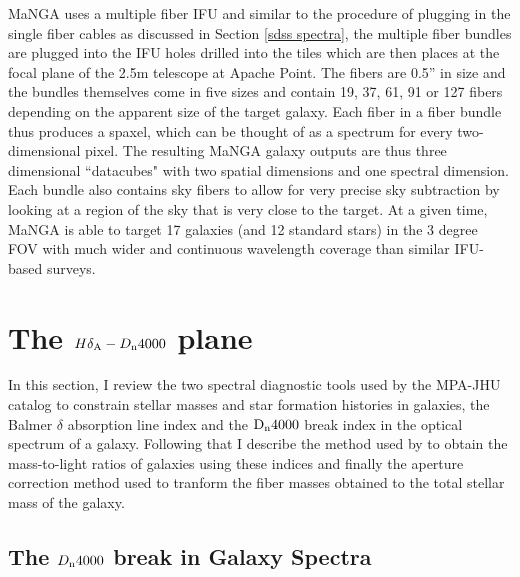 MaNGA uses a multiple fiber IFU \citep{drory_manga_2015} and similar to the procedure of plugging in the single fiber cables as discussed in Section \ref{sdss spectra}, the multiple fiber bundles are plugged into the IFU holes drilled into the tiles which are then places at the focal plane of the 2.5m telescope at Apache Point. The fibers are 0.5'' in size and the bundles themselves come in five sizes and contain 19, 37, 61, 91 or 127 fibers depending on the apparent size of the target galaxy. Each fiber in a fiber bundle thus produces a spaxel, which can be thought of as a spectrum for every two-dimensional pixel. The resulting MaNGA galaxy outputs are thus three dimensional ``datacubes" with two spatial dimensions and one spectral dimension. Each bundle also contains sky fibers to allow for very precise sky subtraction by looking at a region of the sky that is very close to the target. At a given time, MaNGA is able to target 17 galaxies (and 12 standard stars) in the 3 degree FOV with much wider and continuous wavelength coverage than similar IFU-based surveys.\\

\section{The $H\delta_{\rm A}-D_{\rm n}4000$ plane}
\label{indices}

In this section, I review the two spectral diagnostic tools used by the MPA-JHU catalog to constrain stellar masses and star formation histories in galaxies, the Balmer $\delta$ absorption line index and the ${\rm D}_{\rm n}4000$ break index in the optical spectrum of a galaxy. Following that I describe the method used by \citet{kauffmann_stellar_2003} to obtain the mass-to-light ratios of galaxies using these indices and finally the aperture correction method used to tranform the fiber masses obtained to the total stellar mass of the galaxy.\\

\subsection{The $D_{\rm n}4000$ break in Galaxy Spectra}
\label{d4000}

